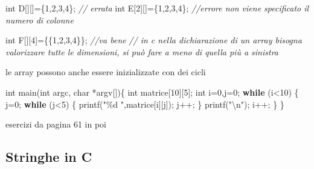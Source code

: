 \documentclass[
]{article}
\newenvironment{Shaded}{}{}
\newcommand{\CommentTok}[1]{\textcolor[rgb]{0.38,0.63,0.69}{\textit{#1}}}
\newcommand{\ControlFlowTok}[1]{\textcolor[rgb]{0.00,0.44,0.13}{\textbf{#1}}}
\newcommand{\DataTypeTok}[1]{\textcolor[rgb]{0.56,0.13,0.00}{#1}}
\newcommand{\DecValTok}[1]{\textcolor[rgb]{0.25,0.63,0.44}{#1}}
\newcommand{\NormalTok}[1]{#1}
\newcommand{\SpecialCharTok}[1]{\textcolor[rgb]{0.25,0.44,0.63}{#1}}
\newcommand{\StringTok}[1]{\textcolor[rgb]{0.25,0.44,0.63}{#1}}
\begin{document}
\begin{Shaded}
\begin{Highlighting}[]
\DataTypeTok{int}\NormalTok{ D[][]=\{}\DecValTok{1}\NormalTok{,}\DecValTok{2}\NormalTok{,}\DecValTok{3}\NormalTok{,}\DecValTok{4}\NormalTok{\}; }\CommentTok{// errata}
\DataTypeTok{int}\NormalTok{ E[}\DecValTok{2}\NormalTok{][]=\{}\DecValTok{1}\NormalTok{,}\DecValTok{2}\NormalTok{,}\DecValTok{3}\NormalTok{,}\DecValTok{4}\NormalTok{\}; }\CommentTok{//errore non viene specificato il numero di colonne}

\DataTypeTok{int}\NormalTok{ F[][}\DecValTok{4}\NormalTok{]=\{\{}\DecValTok{1}\NormalTok{,}\DecValTok{2}\NormalTok{,}\DecValTok{3}\NormalTok{,}\DecValTok{4}\NormalTok{\}\}; }\CommentTok{//va bene }
\CommentTok{// in c nella dichiarazione di un array bisogna valorizzare tutte le dimensioni, si può fare a meno di quella più a sinistra }
\end{Highlighting}
\end{Shaded}

le array possono anche essere inizializzate con dei cicli

\begin{Shaded}
\begin{Highlighting}[]
\DataTypeTok{int}\NormalTok{ main(}\DataTypeTok{int}\NormalTok{ argc, }\DataTypeTok{char}\NormalTok{ *argv[])\{}
    \DataTypeTok{int}\NormalTok{ matrice[}\DecValTok{10}\NormalTok{][}\DecValTok{5}\NormalTok{];}
    \DataTypeTok{int}\NormalTok{ i=}\DecValTok{0}\NormalTok{,j=}\DecValTok{0}\NormalTok{;}
    \ControlFlowTok{while}\NormalTok{ (i\textless{}}\DecValTok{10}\NormalTok{)}
\NormalTok{    \{}
\NormalTok{        j=}\DecValTok{0}\NormalTok{;}
        \ControlFlowTok{while}\NormalTok{ (j\textless{}}\DecValTok{5}\NormalTok{)}
\NormalTok{        \{}
\NormalTok{            printf(}\StringTok{"}\SpecialCharTok{\%d}\StringTok{ "}\NormalTok{,matrice[i][j]);}
\NormalTok{            j++;}
\NormalTok{        \}}
\NormalTok{        printf(}\StringTok{"}\SpecialCharTok{\textbackslash{}n}\StringTok{"}\NormalTok{);}
\NormalTok{        i++;}
\NormalTok{	\}}
\NormalTok{\}}
\end{Highlighting}
\end{Shaded}

esercizi da pagina 61 in poi

\hypertarget{header-n463}{%
\subsection{Stringhe in C}\label{header-n463}}
\end{document}

